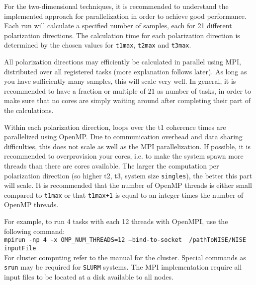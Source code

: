 \documentclass[12pt]{book}
\begin{document}
For the two-dimensional techniques, it is recommended to understand the implemented approach for parallelization in order to achieve good performance. Each run will calculate a specified number of samples, each for 21 different polarization directions. The calculation time for each polarization direction is determined by the chosen values for {\tt t1max}, {\tt t2max} and {\tt t3max}.

All polarization directions may efficiently be calculated in parallel using MPI, distributed over all registered tasks (more explanation follows later). As long as you have sufficiently many samples, this will scale very well. In general, it is recommended to have a fraction or multiple of 21 as number of tasks, in order to make sure that no cores are simply waiting around after completing their part of the calculations.

Within each polarization direction, loops over the t1 coherence times are parallelized using OpenMP. Due to communication overhead and data sharing difficulties, this does not scale as well as the MPI parallelization. If possible, it is recommended to overprovision your cores, i.e. to make the system spawn more threads than there are cores available. The larger the computation per polarization direction (so higher t2, t3, system size {\tt singles}), the better this part will scale. It is recommended that the number of OpenMP threads is either small compared to {\tt t1max} or that {\tt t1max+1} is equal to an integer times the number of OpenMP threads.

For example, to run 4 tasks with each 12 threads with OpenMPI, use the following command:\\
{\tt mpirun -np 4 -x OMP\_NUM\_THREADS=12 --bind-to-socket ~/pathToNISE/NISE inputFile}\\
For cluster computing refer to the manual for the cluster. Special commands as {\tt srun} may be required for {\tt SLURM} systems. The MPI implementation require all input files to be located at a disk available to all nodes.
\end{document}
